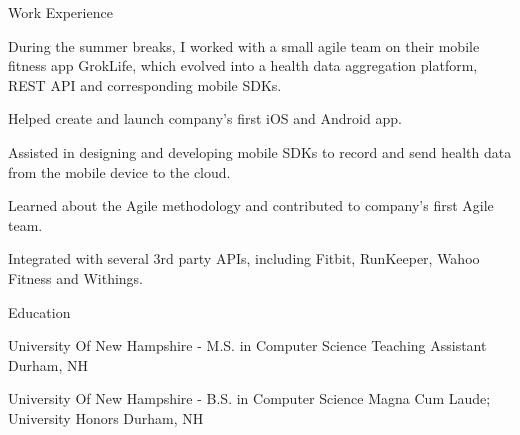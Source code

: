 \documentclass[UKenglish]{resume} %
\begin{document}
\begin{rSection}{Work Experience}
\begin{rSubsection}
        During the summer breaks, I worked with a small agile team on their mobile fitness app GrokLife, which evolved into a health data aggregation platform, REST API and corresponding mobile SDKs.\par
        \item Helped create and launch company’s first iOS and Android app.
        \item Assisted in designing and developing mobile SDKs to record and send health data from the mobile device to the cloud.
        \item Learned about the Agile methodology and contributed to company's first Agile team.
        \item Integrated with several 3rd party APIs, including Fitbit, RunKeeper, Wahoo Fitness and Withings.
    \end{rSubsection}

\end{rSection}



\begin{rSection}{ Education }

    \rSubsectionHeading
        {University Of New Hampshire}
        {  -  }
        {\normalfont M.S. in Computer Science}
        {\normalfont Teaching Assistant}
        {Durham, NH}

    \rSubsectionHeading
        {University Of New Hampshire}
        {  -  }
        {\normalfont B.S. in Computer Science}
        {\normalfont Magna Cum Laude; University Honors}
        {Durham, NH}

\end{rSection}
\end{document}
